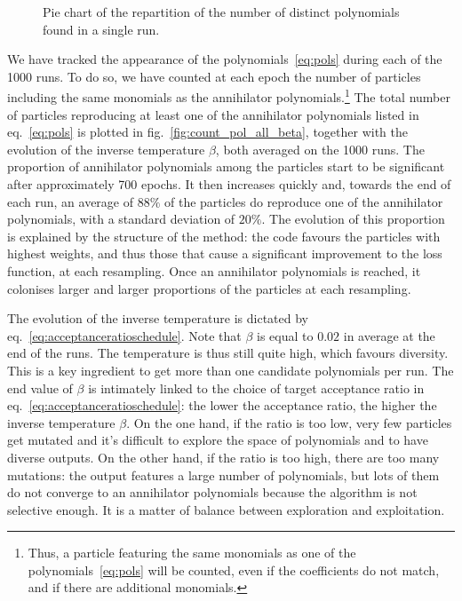 \documentclass[11pt,a4paper]{article}
\begin{document}
	\begin{figure}[b!]
		\centering
		
		\caption{Pie chart of the repartition of the number of distinct polynomials found in a single run.}
		\label{fig:piechart}
	\end{figure}
	  
	We have tracked the appearance of the polynomials~\eqref{eq:pols} during each of the 1000 runs. To do so, we have counted at each epoch the number of particles including the same monomials as the annihilator polynomials.\footnote{Thus, a particle featuring the same monomials as one of the polynomials~\eqref{eq:pols} will be counted, even if the coefficients do not match, and if there are additional monomials.} The total number of particles reproducing at least one of the annihilator polynomials listed in eq.~\eqref{eq:pols} is plotted in fig.~\ref{fig:count_pol_all_beta}, together with the evolution of the inverse temperature $\beta$, both averaged on the 1000 runs. The proportion of annihilator polynomials among the particles start to be significant after approximately 700 epochs. It then increases quickly and, towards the end of each run, an average of $88\%$ of the particles do reproduce one of the annihilator polynomials, with a standard deviation of $20\%$. The evolution of this proportion is explained by the structure of the method: the code favours the particles with highest weights, and thus those that cause a significant improvement to the loss function, at each resampling. Once an annihilator polynomials is reached, it colonises larger and larger proportions of the particles at each resampling.

	The evolution of the inverse temperature is dictated by eq.~\eqref{eq:acceptanceratioschedule}. Note that $\beta$ is equal to $0.02$ in average at the end of the runs. The temperature is thus still quite high, which favours diversity. This is a key ingredient to get more than one candidate polynomials per run. The end value of $\beta$ is intimately linked to the choice of target acceptance ratio in eq.~\eqref{eq:acceptanceratioschedule}: the lower the acceptance ratio, the higher the inverse temperature $\beta$. On the one hand, if the ratio is too low, very few particles get mutated and it's difficult to explore the space of polynomials and to have diverse outputs. On the other hand, if the ratio is too high, there are too many mutations: the output features a large number of polynomials, but lots of them do not converge to an annihilator polynomials because the algorithm is not selective enough. It is a matter of balance between exploration and exploitation.
\end{document}
